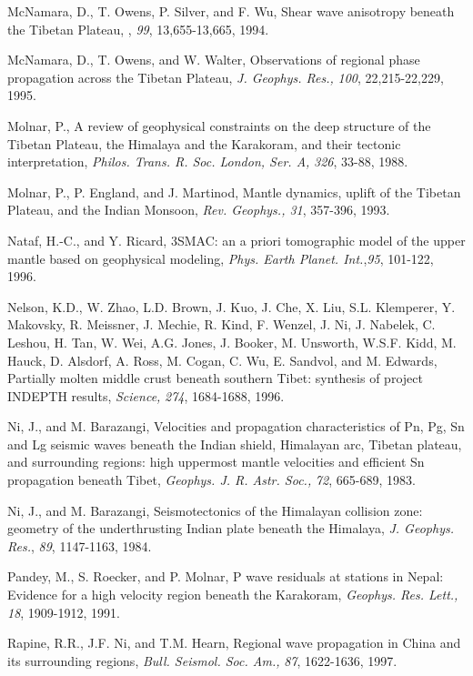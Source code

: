 \documentclass[12pt]{article}
\begin{document}
\begin{references}
McNamara, D., T. Owens, P. Silver, and F. Wu, Shear wave
anisotropy beneath the Tibetan
Plateau, \jgr, {\it 99}, 13,655-13,665, 1994.

McNamara, D., T. Owens, and W. Walter, Observations of 
regional phase propagation across the Tibetan Plateau, {\it J. Geophys. Res.,}
{\it 100}, 22,215-22,229, 1995.

Molnar, P., A review of geophysical constraints on the deep structure
of the Tibetan Plateau, the Himalaya and the Karakoram, and their tectonic
interpretation, {\it Philos. Trans. R. Soc. London, Ser. A,} {\it 326}, 33-88,
1988.

Molnar, P., P. England, and J. Martinod, Mantle dynamics, uplift of the 
Tibetan Plateau, and the Indian Monsoon, {\it Rev. Geophys., 31}, 357-396, 1993.

Nataf, H.-C., and Y. Ricard, {3SMAC: an a priori tomographic
model of the upper mantle based on geophysical modeling}, {\it
Phys. Earth Planet. Int.},{\it 95}, {101-122}, 1996.

Nelson, K.D., W. Zhao, L.D. Brown, J. Kuo, J. Che, X. Liu, S.L. Klemperer,
Y. Makovsky, R. Meissner, J. Mechie, R. Kind, F. Wenzel, J. Ni, J. Nabelek,
C. Leshou, H. Tan, W. Wei, A.G. Jones, J. Booker, M. Unsworth, W.S.F. Kidd,
M. Hauck, D. Alsdorf, A. Ross, M. Cogan, C. Wu, E. Sandvol, and M. Edwards,
Partially molten middle crust beneath southern Tibet: synthesis of
project INDEPTH results, {\it Science,} {\it 274}, 1684-1688, 1996.

Ni, J., and M. Barazangi, Velocities and propagation characteristics
of Pn, Pg, Sn and Lg seismic waves beneath the Indian shield, Himalayan arc,
Tibetan plateau, and surrounding regions: high uppermost mantle velocities
and efficient Sn propagation beneath Tibet, {\it Geophys. J. R. Astr. Soc.,}
{\it 72}, 665-689, 1983.

Ni, J., and M. Barazangi, Seismotectonics of the Himalayan collision zone:
geometry of the underthrusting Indian plate beneath the Himalaya, {\it J. 
Geophys. Res.}, {\it 89}, 1147-1163, 1984.

Pandey, M., S. Roecker, and P. Molnar, P wave residuals at stations in
Nepal: Evidence for a high velocity region beneath the Karakoram, {\it Geophys.
Res. Lett.,} {\it 18}, 1909-1912, 1991.



Rapine, R.R., J.F. Ni, and T.M. Hearn, Regional wave propagation in China
and its surrounding regions, {\it Bull. Seismol. Soc. Am.,} {\it 87},
1622-1636, 1997.


\end{references}
\end{document}
